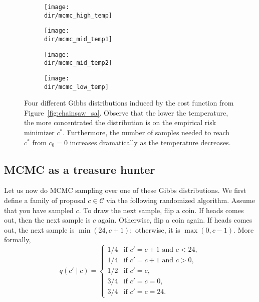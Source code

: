 \begin{figure}
    \centering
    \begin{subfigure}[b]{0.6\textwidth}
        \texttt{[image: \\dir/mcmc\_high\_temp]}
        \caption{}
        \label{fig:mcmc_high_temp}
    \end{subfigure}

    \begin{subfigure}[b]{0.6\textwidth}
        \texttt{[image: \\dir/mcmc\_mid\_temp1]}
        \caption{}
        \label{fig:mcmc_mid1_temp}
    \end{subfigure}
    
    \begin{subfigure}[b]{0.6\textwidth}
        \texttt{[image: \\dir/mcmc\_mid\_temp2]}
        \caption{}
        \label{fig:mcmc_mid2_temp}
    \end{subfigure}

    \begin{subfigure}[b]{0.6\textwidth}
        \texttt{[image: \\dir/mcmc\_low\_temp]}
        \caption{}
        \label{fig:mcmc_low_temp}
    \end{subfigure}
    \caption{Four different Gibbs distributions induced by the cost function
from Figure~\ref{fig:chainsaw_sa}. Observe that the lower the temperature, the more
concentrated the distribution is on the empirical risk minimizer $c^*$. Furthermore,
the number of samples needed to reach $c^*$ from $c_0 = 0$ increases
dramatically as the temperature decreases.}
\end{figure}

\subsection{MCMC as a treasure hunter}

Let us now do MCMC sampling over one of these Gibbs distributions.
We first define a family of proposal $c \in \mathcal{C}$ via
the following randomized algorithm. Assume that you have sampled $c$. To
draw the next sample, flip a coin. If heads comes out, then the next sample
is $c$ again. Otherwise, flip a coin again. If heads comes out, the next sample is $\min(24, c + 1);$ otherwise, it is $\max(0, c - 1)$. More formally,
%
\begin{equation}
q(c' \mid c) =
\begin{cases}
1/4 & \text{if $c' = c + 1$ and $c < 24$},\\
1/4 & \text{if $c' = c + 1$ and $c > 0$},\\
1/2 & \text{if $c' = c$},\\
3/4 & \text{if $c' = c = 0$},\\
3/4 & \text{if $c' = c = 24$}.
\end{cases}
\end{equation}

